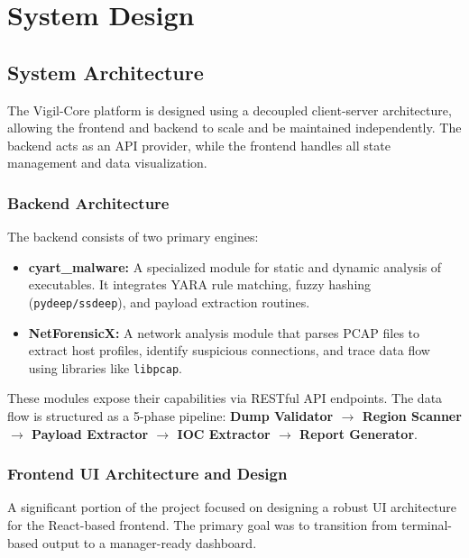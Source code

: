 \chapter{System Design}

\section{System Architecture}
The Vigil-Core platform is designed using a decoupled client-server architecture, allowing the frontend and backend to scale and be maintained independently. The backend acts as an API provider, while the frontend handles all state management and data visualization.

\subsection{Backend Architecture}
The backend consists of two primary engines:
\begin{itemize}
    \item \textbf{cyart\_malware:} A specialized module for static and dynamic analysis of executables. It integrates YARA rule matching, fuzzy hashing (\texttt{pydeep/ssdeep}), and payload extraction routines.
    \item \textbf{NetForensicX:} A network analysis module that parses PCAP files to extract host profiles, identify suspicious connections, and trace data flow using libraries like \texttt{libpcap}.
\end{itemize}
These modules expose their capabilities via RESTful API endpoints. The data flow is structured as a 5-phase pipeline: 
\textbf{Dump Validator $\rightarrow$ Region Scanner $\rightarrow$ Payload Extractor $\rightarrow$ IOC Extractor $\rightarrow$ Report Generator}.

\subsection{Frontend UI Architecture and Design}
A significant portion of the project focused on designing a robust UI architecture for the React-based frontend. The primary goal was to transition from terminal-based output to a manager-ready dashboard.

